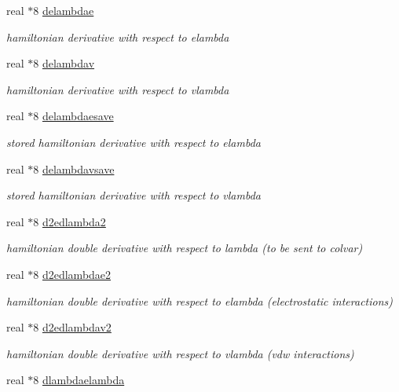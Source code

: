 \begin{DoxyCompactItemize}
real $\ast$8 \hyperlink{classderiv_a492abed147ecbc1c1a0714b6de99d570}{delambdae}
\begin{DoxyCompactList}\small\item\em hamiltonian derivative with respect to elambda \end{DoxyCompactList}\item 
real $\ast$8 \hyperlink{classderiv_ad4e8728a9503b786c371e81cbf1948ca}{delambdav}
\begin{DoxyCompactList}\small\item\em hamiltonian derivative with respect to vlambda \end{DoxyCompactList}\item 
real $\ast$8 \hyperlink{classderiv_aa0f0b04326cf8dd8725cee1829c52340}{delambdaesave}
\begin{DoxyCompactList}\small\item\em stored hamiltonian derivative with respect to elambda \end{DoxyCompactList}\item 
real $\ast$8 \hyperlink{classderiv_a80f5ce711443744988b4cb3dd1f563d0}{delambdavsave}
\begin{DoxyCompactList}\small\item\em stored hamiltonian derivative with respect to vlambda \end{DoxyCompactList}\item 
real $\ast$8 \hyperlink{classderiv_affaa0b9e69d073a2e87bdf2af4e87d1b}{d2edlambda2}
\begin{DoxyCompactList}\small\item\em hamiltonian double derivative with respect to lambda (to be sent to colvar) \end{DoxyCompactList}\item 
real $\ast$8 \hyperlink{classderiv_ade349a1c2864830e3ed301aa15f22b1e}{d2edlambdae2}
\begin{DoxyCompactList}\small\item\em hamiltonian double derivative with respect to elambda (electrostatic interactions) \end{DoxyCompactList}\item 
real $\ast$8 \hyperlink{classderiv_aa177d2f37dcb5778b286ddf812d2c3bc}{d2edlambdav2}
\begin{DoxyCompactList}\small\item\em hamiltonian double derivative with respect to vlambda (vdw interactions) \end{DoxyCompactList}\item 
real $\ast$8 \hyperlink{classderiv_a0122c85565ea213dfaaee75053d1d14f}{dlambdaelambda}

\end{DoxyCompactItemize}
